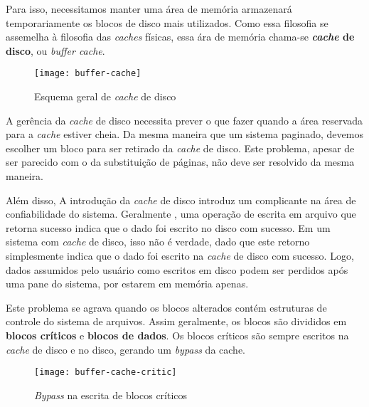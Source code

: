 Para isso, necessitamos manter uma área de memória armazenará temporariamente os blocos de disco mais utilizados. Como essa filosofia se assemelha à filosofia das \textit{caches} físicas, essa ára de memória chama-se \textbf{\textit{cache} de disco}, ou \textit{buffer cache}.

\begin{figure}[h]
  \centering
  \texttt{[image: buffer-cache]}
  \caption{Esquema geral de \textit{cache} de disco}
  \label{fig:buffer-cache}
\end{figure}

A gerência da \textit{cache} de disco necessita prever o que fazer quando a área reservada para a \textit{cache} estiver cheia. Da mesma maneira que um sistema paginado, devemos escolher um bloco para ser retirado da \textit{cache} de disco. Este problema, apesar de ser parecido com o da substituição de páginas, não deve ser resolvido da mesma maneira.

Além disso, A introdução da \textit{cache} de disco introduz um complicante na área de confiabilidade do sistema. Geralmente , uma operação de escrita em arquivo que retorna sucesso indica que o dado foi escrito no disco com sucesso. Em um sistema com \textit{cache} de disco, isso não é verdade, dado que este retorno simplesmente indica que o dado foi escrito na \textit{cache} de disco com sucesso. Logo, dados assumidos pelo usuário como escritos em disco podem ser perdidos após uma pane do sistema, por estarem em memória apenas.

Este problema se agrava quando os blocos alterados contém estruturas de controle do sistema de arquivos. Assim geralmente, os blocos são divididos em \textbf{blocos críticos} e \textbf{blocos de dados}. Os blocos críticos são sempre escritos na \textit{cache} de disco e no disco, gerando um \textit{bypass} da cache.

\begin{figure}[h]
  \centering
  \texttt{[image: buffer-cache-critic]}
  \caption{\textit{Bypass} na escrita de blocos críticos}
  \label{fig:buffer-cache-critic}
\end{figure}
